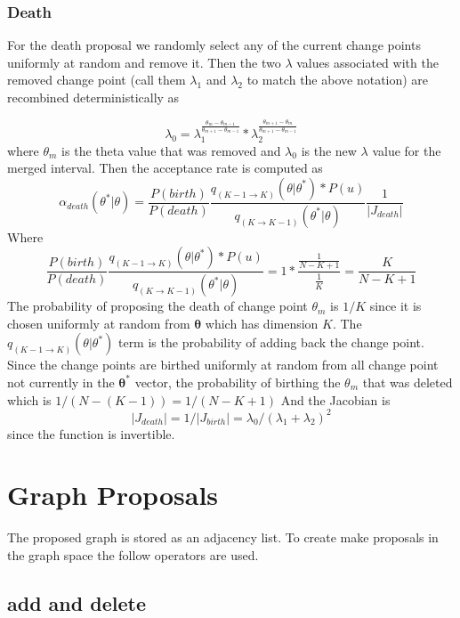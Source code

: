 \documentclass[]{article}
\numberwithin{equation}{section}
\begin{document}
\hypertarget{death}{%
\subsubsection{Death}\label{death}}

For the death proposal we randomly select any of the current change
points uniformly at random and remove it. Then the two \(\lambda\)
values associated with the removed change point (call them \(\lambda_1\)
and \(\lambda_2\) to match the above notation) are recombined
deterministically as

\[ \lambda_0 =\lambda_1^{\frac{\theta_m-\theta_{m-1}}{\theta_{m+1}-\theta_{m-1}}}*\lambda_2^{\frac{\theta_{m+1}-\theta_{m}}{\theta_{m+1}-\theta_{m-1}}} \]
where \(\theta_m\) is the theta value that was removed and \(\lambda_0\)
is the new \(\lambda\) value for the merged interval. Then the
acceptance rate is computed as
\[\alpha_{death}(\theta^*|\theta) = \frac{P(birth)}{P(death)}\frac{q_{(K-1\rightarrow K)}(\theta|\theta^*)*P(u)}{q_{(K\rightarrow K - 1)}(\theta^*|\theta)}\frac{1}{|J_{death}|}\]
Where
\[ \frac{P(birth)}{P(death)}\frac{q_{(K-1\rightarrow K)}(\theta|\theta^*)*P(u)}{q_{(K\rightarrow K - 1)}(\theta^*|\theta)} = 1*\frac{\frac{1}{N-K+1}}{\frac{1}{K}} = \frac{K}{N-K+1} \]
The probability of proposing the death of change point \(\theta_m\) is
\(1/K\) since it is chosen uniformly at random from
\(\boldsymbol{\theta}\) which has dimension \(K\). The
\(q_{(K-1\rightarrow K)}(\theta|\theta^*)\) term is the probability of
adding back the change point. Since the change points are birthed
uniformly at random from all change point not currently in the
\(\boldsymbol{\theta^*}\) vector, the probability of birthing the
\(\theta_m\) that was deleted which is \(1/(N-(K-1)) = 1/(N-K+1)\) And
the Jacobian is
\[|J_{death}| = 1/|J_{birth}| = \lambda_0/(\lambda_1 + \lambda_2)^2\]
since the function is invertible.

\hypertarget{graph-proposals}{%
\section{Graph Proposals}\label{graph-proposals}}

The proposed graph is stored as an adjacency list. To create make
proposals in the graph space the follow operators are used.

\hypertarget{add-and-delete}{%
\subsection{add and delete}\label{add-and-delete}}
\end{document}
